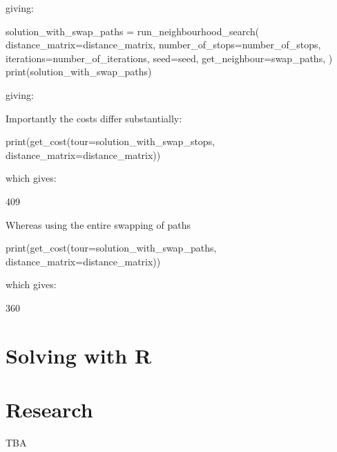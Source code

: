 giving:

\begin{pyout}
[0, 2, 4, 17, 6, 10, 7, 14, 8, 9, 5, 15, 1, 16, 3, 12, 13, 11, 0]
\end{pyout}

\begin{pyin}
solution_with_swap_paths = run_neighbourhood_search(
    distance_matrix=distance_matrix,
    number_of_stops=number_of_stops,
    iterations=number_of_iterations,
    seed=seed,
    get_neighbour=swap_paths,
)
print(solution_with_swap_paths)
\end{pyin}

giving:

\begin{pyout}
[0, 13, 12, 3, 16, 1, 5, 9, 8, 15, 14, 7, 10, 6, 17, 4, 2, 11, 0]
\end{pyout}

Importantly the costs differ substantially:

\begin{pyin}
print(get_cost(tour=solution_with_swap_stops, distance_matrix=distance_matrix))
\end{pyin}

which gives:

\begin{pyout}
409
\end{pyout}

Whereas using the entire swapping of paths %

\begin{pyin}
print(get_cost(tour=solution_with_swap_paths, distance_matrix=distance_matrix))
\end{pyin}

which gives:

\begin{pyout}
360
\end{pyout}


\section{Solving with R}\label{sec:solving-with-R}

\section{Research}\label{sec:research}

TBA
